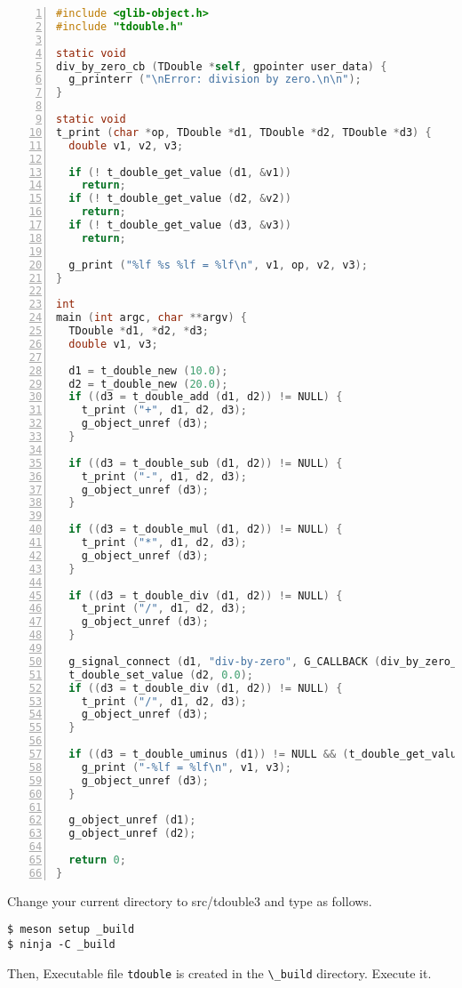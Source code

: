 \begin{lstlisting}[language=C, numbers=left]
#include <glib-object.h>
#include "tdouble.h"

static void
div_by_zero_cb (TDouble *self, gpointer user_data) {
  g_printerr ("\nError: division by zero.\n\n");
}

static void
t_print (char *op, TDouble *d1, TDouble *d2, TDouble *d3) {
  double v1, v2, v3;

  if (! t_double_get_value (d1, &v1))
    return;
  if (! t_double_get_value (d2, &v2))
    return;
  if (! t_double_get_value (d3, &v3))
    return;

  g_print ("%lf %s %lf = %lf\n", v1, op, v2, v3);
}

int
main (int argc, char **argv) {
  TDouble *d1, *d2, *d3;
  double v1, v3;

  d1 = t_double_new (10.0);
  d2 = t_double_new (20.0);
  if ((d3 = t_double_add (d1, d2)) != NULL) {
    t_print ("+", d1, d2, d3);
    g_object_unref (d3);
  }

  if ((d3 = t_double_sub (d1, d2)) != NULL) {
    t_print ("-", d1, d2, d3);
    g_object_unref (d3);
  }

  if ((d3 = t_double_mul (d1, d2)) != NULL) {
    t_print ("*", d1, d2, d3);
    g_object_unref (d3);
  }

  if ((d3 = t_double_div (d1, d2)) != NULL) {
    t_print ("/", d1, d2, d3);
    g_object_unref (d3);
  }

  g_signal_connect (d1, "div-by-zero", G_CALLBACK (div_by_zero_cb), NULL);
  t_double_set_value (d2, 0.0);
  if ((d3 = t_double_div (d1, d2)) != NULL) {
    t_print ("/", d1, d2, d3);
    g_object_unref (d3);
  }

  if ((d3 = t_double_uminus (d1)) != NULL && (t_double_get_value (d1, &v1)) && (t_double_get_value (d3, &v3))) {
    g_print ("-%lf = %lf\n", v1, v3);
    g_object_unref (d3);
  }

  g_object_unref (d1);
  g_object_unref (d2);

  return 0;
}
\end{lstlisting}

Change your current directory to src/tdouble3 and type as follows.

\begin{lstlisting}
$ meson setup _build
$ ninja -C _build
\end{lstlisting}

Then, Executable file \passthrough{\lstinline!tdouble!} is created in
the \passthrough{\lstinline!\_build!} directory. Execute it.

